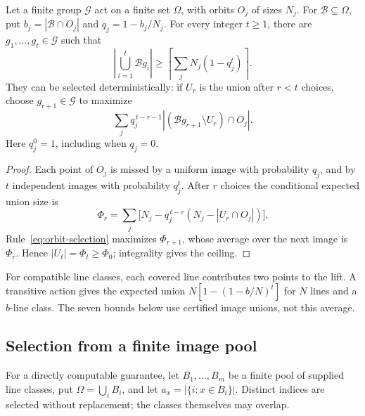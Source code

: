 \begin{proposition}\label{prop:orbit-union}
Let a finite group $\mathcal G$ act on a finite set $\Omega$, with
orbits $O_j$ of sizes $N_j$. For $\mathcal B\subseteq\Omega$, put
$b_j=|\mathcal B\cap O_j|$ and $q_j=1-b_j/N_j$. For every integer
$t\ge1$, there are $g_1,\ldots,g_t\in\mathcal G$ such that
\begin{equation}\label{eq:orbit-union}
 \left|\bigcup_{i=1}^t\mathcal B g_i\right|
 \ge\left\lceil\sum_jN_j(1-q_j^t)\right\rceil.
\end{equation}
They can be selected deterministically: if $U_r$ is the union after
$r<t$ choices, choose $g_{r+1}\in\mathcal G$ to maximize
\begin{equation}\label{eq:orbit-selection}
 \sum_jq_j^{\,t-r-1}
       |(\mathcal B g_{r+1}\setminus U_r)\cap O_j|.
\end{equation}
Here $q_j^0=1$, including when $q_j=0$.
\end{proposition}
\begin{proof}
Each point of $O_j$ is missed by a uniform image with probability $q_j$,
and by $t$ independent images with probability $q_j^t$. After $r$ choices
the conditional expected union size is
\[
 \Phi_r=\sum_j\bigl[N_j-q_j^{\,t-r}(N_j-|U_r\cap O_j|)\bigr].
\]
Rule~\eqref{eq:orbit-selection} maximizes $\Phi_{r+1}$, whose average
over the next image is $\Phi_r$. Hence $|U_t|=\Phi_t\ge\Phi_0$;
integrality gives the ceiling.
\end{proof}

For compatible line classes, each covered line contributes two points
to the lift. A transitive action gives the expected union
$N[1-(1-b/N)^t]$ for $N$ lines and a $b$-line class. The seven bounds
below use certified image unions, not this average.

\subsection{Selection from a finite image pool}
For a directly computable guarantee, let $B_1,\ldots,B_m$ be a finite
pool of supplied line classes, put $\Omega=\bigcup_iB_i$, and let
$a_x=|\{i:x\in B_i\}|$. Distinct indices are selected without
replacement; the classes themselves may overlap.

